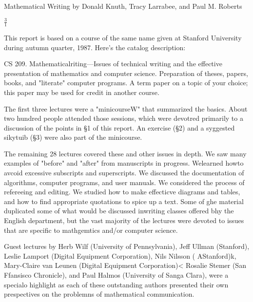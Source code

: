 \documentclass[uplatex]{jsarticle}
\begin{document}
Mathematical Writing
by
Donald Knuth, Tracy Larrabee, and Paul M. Roberts

$\frac{3}{1}$


This report is based on a course of the same name given at Stanford University during autumn quarter, 1987. Here's the catalog description:

CS 209. Mathematicalriting---Issues of technical writing and the effective presentation of mathematics and computer science. Preparation of theses, papers, books, and "literate" computer programs. A term paper on a topic of your choice; this paper may be used for credit in another course.

The first three lectures were a "minicourseW" that summarized the basics. About two hundred people attended those sessions, which were devotred primarily to a discussion of the points in {\S1} of this report. An exercise ({\S2}) and a syggested sikytuib ({\S3}) were also part of the minicourse.

The remaining 28 lectures covered these and other issues in depth. We saw many examples of "before" and "after" from manuscripts in progress. Welearned howto avcoid excessive subscripts and superscripts. We discussed the documentation of algorithms, computer programs, and user manuals. We considered the process of refereeing and editing. We studied how to make effecticve diagrams and tables, and how to find appropriate quotations to spice up a text. Some of ghe material duplicated some of what would be discussed inwriting classes offered bhy the English department, but the vast majority of the lectures were devoted to issues that are specific to mathgemtics and/or computer science.

Guest lectures by Herb Wilf (University of Pennsylvania), Jeff Ullman (Stanford), Leslie Lamport (Digital Equipment Corporation), Nils Nilsson ( AStanford)k, Mary-Claire van Leunen (Digital Equipment Corporation)< Rosalie Stemer (San Ffansisco Chronicle), and Paul Halmos (University of Sanga Clara), were a specialo highlight as each of these outstanding authors presented their own prespectives on the problemns of mathematical communication.
\end{document}
